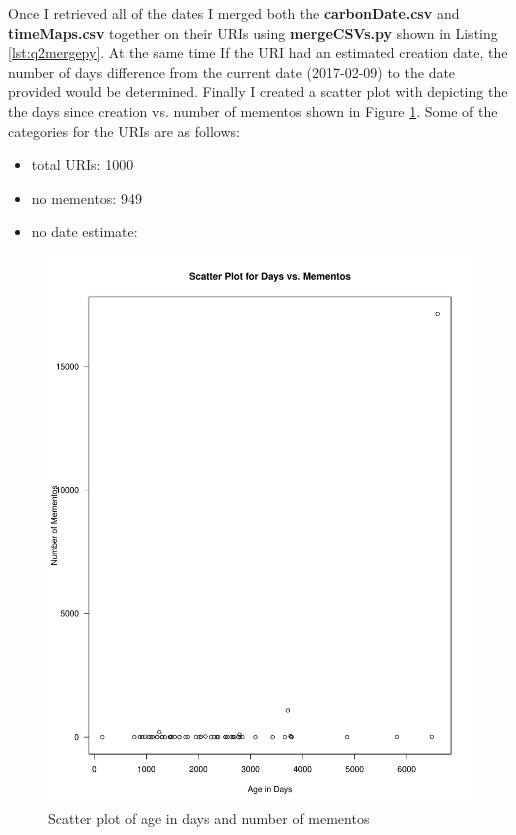\documentclass[letterpaper,11pt]{article}
\newcommand*{\srcPath}{../src}%
\begin{document}
Once I retrieved all of the dates I merged both the \textbf{carbonDate.csv} and \textbf{timeMaps.csv} together on their URIs using \textbf{mergeCSVs.py} shown in Listing \ref{lst:q2mergepy}. At the same time If the URI had an estimated creation date, the number of days difference from the current date (2017-02-09) to the date provided would be determined. Finally I created a scatter plot with depicting the the days since creation vs. number of mementos shown in Figure \ref{fig:scatterplot}. Some of the categories for the URIs are as follows:

\begin{itemize}
  \item total URIs:	1000
  \item no mementos: 949
  \item no date estimate: 
\end{itemize}




\begin{figure}[h]
\includegraphics[scale=0.5]{carbonDateScatterplot.pdf}
\caption{Scatter plot of age in days and number of mementos}
\label{fig:scatterplot}
\end{figure}
\end{document}
